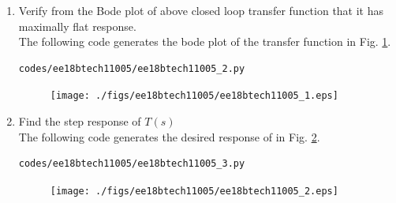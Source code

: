\begin{enumerate}[label=\arabic*.,ref=\theenumi]
\item Verify from the Bode plot of above closed loop transfer function that it has maximally flat response.
\\
\solution The following code generates the bode plot of the transfer function in Fig. \ref{fig:ee18btech11005_1}.
\begin{lstlisting}
codes/ee18btech11005/ee18btech11005_2.py
\end{lstlisting}
\begin{figure}[!ht]
\centering
\texttt{[image: ./figs/ee18btech11005/ee18btech11005\_1.eps]}
\caption{}
\label{fig:ee18btech11005_1}
\end{figure}
\item Find the step response of $T(s)$
\\
\solution The following code generates the desired response of in Fig. \ref{fig:ee18btech11005_2}.
\begin{lstlisting}
codes/ee18btech11005/ee18btech11005_3.py
\end{lstlisting}
%
\begin{figure}[!ht]
\centering
\texttt{[image: ./figs/ee18btech11005/ee18btech11005\_2.eps]}
\caption{}
\label{fig:ee18btech11005_2}
\end{figure}


\end{enumerate}
